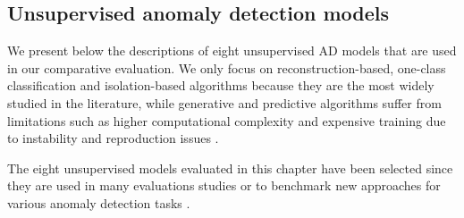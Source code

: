 \subsection{Unsupervised anomaly detection models}\label{unsupervised_ad}
We present below the descriptions of eight unsupervised AD models that are used in our comparative evaluation. We only focus on reconstruction-based, one-class classification and isolation-based algorithms because they are the most widely studied in the literature, while generative and predictive algorithms suffer from limitations such as higher computational complexity and expensive training due to instability and reproduction issues \cite{Ren2021DeepVA}. 

The eight unsupervised models evaluated in this chapter have been selected since they are used in many evaluations studies or to benchmark new approaches for various anomaly detection tasks \cite{han2022adbench, 9964447, Paparrizos2022TSBUADAE}.

    
    
        
        
